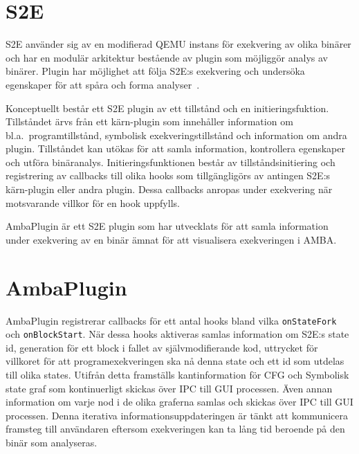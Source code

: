 \section{S2E}
S2E använder sig av en modifierad QEMU instans för exekvering av olika
binärer och har en modulär arkitektur bestående av plugin som
möjliggör analys av binärer. Plugin har möjlighet att följa S2E:s
exekvering och undersöka egenskaper för att spåra och forma
analyser~\cite{Chipounov12}.

Konceptuellt består ett S2E plugin av ett tillstånd och en
initieringsfuktion. Tillståndet ärvs från ett kärn-plugin som
innehåller information om bl.a.\ programtillstånd, symbolisk
exekveringstillstånd och information om andra plugin. Tillståndet kan
utökas för att samla information, kontrollera egenskaper och utföra
binäranalys. Initieringsfunktionen består av tillståndsinitiering och
registrering av callbacks till olika hooks som tillgängligörs av
antingen S2E:s kärn-plugin eller andra plugin. Dessa callbacks anropas
under exekvering när motsvarande villkor för en hook uppfylls.

AmbaPlugin är ett S2E plugin som har utvecklats för att samla
information under exekvering av en binär ämnat för att visualisera
exekveringen i AMBA.\@

\section{AmbaPlugin}
AmbaPlugin registrerar callbacks för ett antal hooks bland vilka
\texttt{onStateFork} och \texttt{onBlockStart}.
När dessa hooks aktiveras samlas information om S2E:s state id,
generation för ett block i fallet av självmodifierande kod, uttrycket
för villkoret för att programexekveringen ska nå denna state och ett
id som utdelas till olika states. Utifrån detta framställs
kantinformation för CFG och Symbolisk state graf som kontinuerligt
skickas över IPC till GUI processen. Även annan information om varje
nod i de olika graferna samlas och skickas över IPC till GUI
processen. Denna iterativa informationsuppdateringen är tänkt att
kommunicera framsteg till användaren eftersom exekveringen kan ta lång
tid beroende på den binär som analyseras.


